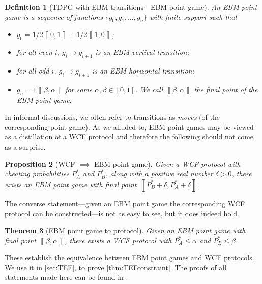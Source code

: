 \documentclass{article}
\newtheorem{theorem}{Theorem}\newtheorem{lemma}[theorem]{Lemma}\newtheorem{proposition}[theorem]{Proposition}\newtheorem{corollary}[theorem]{Corollary}\newtheorem{definition}[theorem]{Definition}\newtheorem{claim}[theorem]{Claim}\newtheorem{remark}[theorem]{Remark}\newtheorem{example}[theorem]{Example}
\begin{document}
%

%
\begin{definition}[TDPG with EBM transitions---EBM point game]
  \label{def:EBMpointGame} An EBM point game is a sequence of functions
  $\{g_{0},g_{1},\dots,g_{n}\}$ with finite support such that
  \begin{itemize}
    \item $g_{0}=1/2\left\llbracket 0,1\right\rrbracket +1/2\left\llbracket 1,0\right\rrbracket $;
    \item for all even $i$, $g_{i}\to g_{i+1}$ is an EBM vertical transition;
    \item for all odd $i$, $g_{i}\to g_{i+1}$ is an EBM horizontal transition;
    \item $g_{n}=1\left\llbracket \beta,\alpha\right\rrbracket $ for some $\alpha,\beta\in[0,1]$.
          We call $\left\llbracket \beta,\alpha\right\rrbracket $ the final
          point of the EBM point game.
  \end{itemize}
\end{definition}

%
In informal discussions, we often refer to transitions as \emph{moves} (of the corresponding point game).
%
As we alluded to, EBM point games may be viewed as a distillation of a WCF protocol and therefore the following should not come as a surprise.
%
%
%

\begin{proposition}[WCF $\implies$ EBM point game]
  \label{prop:WCFimpliesEBMPointGame}Given a WCF protocol with cheating
  probabilities $P_{A}^{*}$ and $P_{B}^{*}$, along with a positive
  real number $\delta>0$, there exists an EBM point game with final
  point $\left\llbracket P_{B}^{*}+\delta,P_{A}^{*}+\delta\right\rrbracket $.
\end{proposition}


The converse statement---given
an EBM point game the corresponding WCF protocol can be constructed---is not as easy to see, but it does indeed hold.
%
\begin{theorem}[EBM point game to protocol]
  \label{thm:EBMpointGameToWCFprotocol}Given an EBM point game with
  final point $\left\llbracket\beta,\alpha\right\rrbracket$, there exists a WCF protocol with $P_{A}^{*}\le\alpha$
  and $P_{B}^{*}\le\beta$.
\end{theorem}
These establish the equivalence between EBM point games and WCF protocols. We use it in \cref{sec:TEF}, to prove \cref{thm:TEFconstraint}. The proofs of all statements made here can be found in \cite{Mochon07,ACG+14}. %
\end{document}
